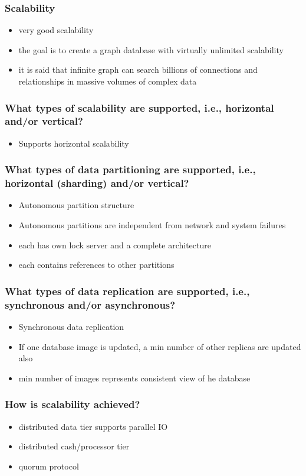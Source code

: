 \begin{frame}
\frametitle{Scalability}
\begin{itemize}
  \item very good scalability
         \item the goal is to create a graph database with virtually unlimited scalability
         \item it is said that infinite graph can search billions of connections and relationships in massive volumes of complex data
\end{itemize}
\end{frame} 


\begin{frame}
\frametitle{What types of scalability are supported, i.e., horizontal and/or vertical?}
\begin{itemize}
	\item Supports horizontal scalability
\end{itemize}
\end{frame} 

\begin{frame}
\frametitle{What types of data partitioning are supported, i.e., horizontal (sharding) and/or vertical?}
\begin{itemize}
	\item Autonomous partition structure	
	\item Autonomous partitions are independent from network and system failures
	\item each has own lock server and a complete architecture
	\item each contains references to other partitions
\end{itemize}
\end{frame} 

\begin{frame}
\frametitle{What types of data replication are supported, i.e., synchronous and/or asynchronous?}
\begin{itemize}
	\item Synchronous data replication
	\item If one database image is updated, a min number of other replicas are updated also
	\item min number of images represents consistent view of he database
\end{itemize}
\end{frame} 

\begin{frame}
\frametitle{How is scalability achieved?}
\begin{itemize}
	\item distributed data tier supports parallel IO
	\item distributed cash/processor tier
         \item quorum protocol
\end{itemize}
\end{frame} 


